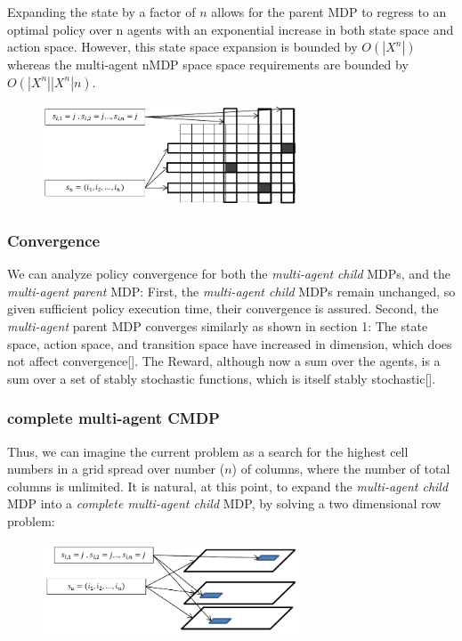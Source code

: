 \documentclass[compsoc,journal,letterpaper,10pt,draftcls,twocolumn]{IEEEtran}
\begin{document}
Expanding the state by a factor of \(n\) allows for the parent MDP to
regress to an optimal policy over \(\text{n\ }\)agents with an
exponential increase in both state space and action space. However, this
state space expansion is bounded by \(O(\left| X^{n} \right|)\) whereas
the multi-agent nMDP space space requirements are bounded by
\(O(\left| X^{n} \right|\left| X^{n} \right|n)\).

 
\begin{figure}[!t]
\centering
\includegraphics[width=3in]{media/figure8}
\end{figure}


\subsubsection{Convergence}\label{convergence-1}

We can analyze policy convergence for both the \emph{multi-agent}
\emph{child} MDPs, and the \emph{multi-agent} \emph{parent} MDP: First,
the \emph{multi-agent child} MDPs remain unchanged, so given sufficient
policy execution time, their convergence is assured. Second, the
\emph{multi-agent} parent MDP converges similarly as shown in section 1:
The state space, action space, and transition space have increased in
dimension, which does not affect convergence{[}{]}. The Reward, although
now a sum over the agents, is a sum over a set of stably stochastic
functions, which is itself stably stochastic{[}{]}.

\subsubsection{complete multi-agent
CMDP}\label{complete-multi-agent-cmdp}

Thus, we can imagine the current problem as a search for the highest
cell numbers in a grid spread over number (\(n\)) of columns, where the
number of total columns is unlimited. It is natural, at this point, to
expand the \emph{multi-agent child} MDP into a \emph{complete
multi-agent child} MDP, by solving a two dimensional row problem:

\begin{figure}[!t]
\centering
\includegraphics[width=3in]{media/figure9}
\end{figure} 
\end{document}

